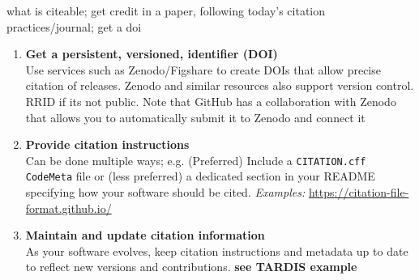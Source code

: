 \documentclass[twocolumn]{openjournal}
\begin{document}
what is citeable;
get credit in a paper, following today's citation practices/journal; 
get a doi

\begin{enumerate}



    


    \item \textbf{Get a persistent, versioned, identifier (DOI)} \\
    Use services such as Zenodo/Figshare to create  DOIs that allow precise citation of releases. Zenodo and similar resources also support version control. RRID if its not public. Note that GitHub has a collaboration with Zenodo that allows you to automatically submit it to Zenodo and connect it 


        \item \textbf{Provide citation instructions} \\
    Can be done multiple ways; e.g.
    (Preferred) Include a \texttt{CITATION.cff} \texttt{CodeMeta} file or (less preferred) a dedicated section in your README specifying how your software should be cited. 
    \textit{Examples: }
    \url{https://citation-file-format.github.io/}

    
    \item \textbf{Maintain and update citation information} \\
    As your software evolves, keep citation instructions and metadata up to date to reflect new versions and contributions.
    \textbf{see TARDIS example}

\end{enumerate}
\end{document}
